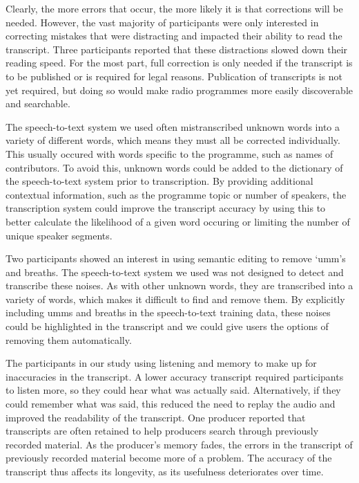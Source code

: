 Clearly, the more errors that occur, the more likely it is that corrections will be needed. However, the vast majority
of participants were only interested in correcting mistakes that were distracting and impacted their ability to read
the transcript. Three participants reported that these distractions slowed down their reading speed.  For the most
part, full correction is only needed if the transcript is to be published or is required for legal reasons. Publication
of transcripts is not yet required, but doing so would make radio programmes more easily discoverable and searchable.


The speech-to-text system we used often mistranscribed unknown words into a variety of different words, which means
they must all be corrected individually. This usually occured with words specific to the programme, such as names of
contributors. To avoid this, unknown words could be added to the dictionary of the speech-to-text system prior to
transcription. By providing additional contextual information, such as the programme topic or number of speakers, the
transcription system could improve the transcript accuracy by using this to better calculate the likelihood of a given
word occuring or limiting the number of unique speaker segments.

Two participants showed an interest in using semantic editing to remove `umm's and breaths. The speech-to-text system
we used was not designed to detect and transcribe these noises. As with other unknown words, they are transcribed into
a variety of words, which makes it difficult to find and remove them. By explicitly including umms and breaths in the
speech-to-text training data, these noises could be highlighted in the transcript and we could give users the options
of removing them automatically.

The participants in our study using listening and memory to make up for inaccuracies in the transcript. A lower
accuracy transcript required participants to listen more, so they could hear what was actually said. Alternatively, if
they could remember what was said, this reduced the need to replay the audio and improved the readability of the
transcript.  One producer reported that transcripts are often retained to help producers search through previously
recorded material. As the producer's memory fades, the errors in the transcript of previously recorded material become
more of a problem. The accuracy of the transcript thus affects its longevity, as its usefulness deteriorates over time.

